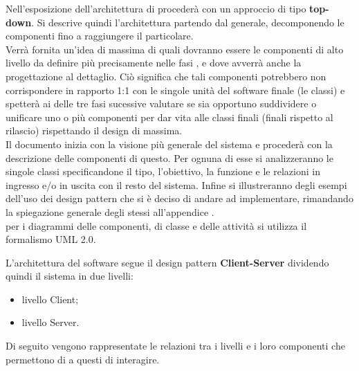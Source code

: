 
Nell'esposizione dell'architettura di procederà con un approccio di tipo \textbf{top-down}. Si descrive quindi l’architettura partendo dal generale, decomponendo le componenti fino a raggiungere il particolare.\\
Verrà fornita un'idea di massima di quali dovranno essere le componenti di alto livello da definire più precisamente nelle fasi ,  e  dove avverrà anche la progettazione al dettaglio. Ciò significa che tali componenti potrebbero non corrispondere in rapporto 1:1 con le singole unità del software finale (le classi) e spetterà ai  delle tre fasi sucessive valutare se sia opportuno suddividere o unificare uno o più componenti per dar vita alle classi finali (finali rispetto al rilascio) rispettando il design di massima.\\
Il documento inizia con la visione più generale del sistema e procederà con la descrizione delle componenti di questo. Per ognuna di esse si analizzeranno le singole classi specificandone il tipo, l'obiettivo, la funzione e le relazioni in ingresso e/o in uscita con il resto del sistema. Infine si illustreranno degli esempi dell'uso dei design pattern che si è deciso di andare ad implementare, rimandando la spiegazione generale degli stessi all'appendice%
.\\
per i diagrammi delle componenti, di classe e delle attività si utilizza il formalismo UML 2.0. %

L'architettura del software segue il design pattern \textbf{Client-Server} dividendo quindi il sistema in due livelli:
\begin{itemize}
	\item{livello Client};
	\item{livello Server}.
\end{itemize}
Di seguito vengono rappresentate le relazioni tra i livelli e i loro componenti che permettono di a questi di interagire.


